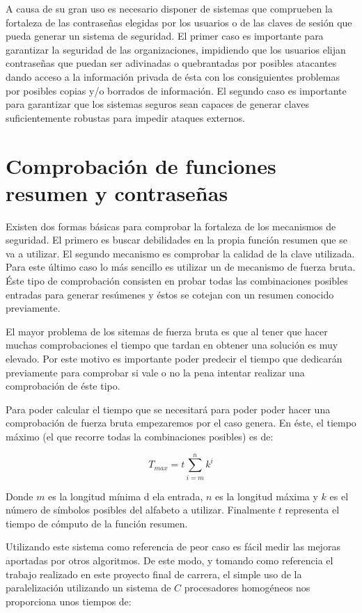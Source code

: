 A causa de su gran uso es necesario disponer de sistemas que comprueben la fortaleza de las contraseñas elegidas por los usuarios o de las claves de sesión que pueda generar un sistema de seguridad. El primer caso es importante para garantizar la seguridad de las organizaciones, impidiendo que los usuarios elijan contraseñas que puedan ser adivinadas o quebrantadas por posibles atacantes dando acceso a la información privada de ésta con los consiguientes problemas por posibles copias y/o borrados de información. El segundo caso es importante para garantizar que los sistemas seguros sean capaces de generar claves suficientemente robustas para impedir ataques externos.

\section{Comprobación de funciones resumen y contraseñas}

Existen dos formas básicas para comprobar la fortaleza de los mecanismos de seguridad. El primero es buscar debilidades en la propia función resumen que se va a utilizar. El segundo mecanismo es comprobar la calidad de la clave utilizada. Para este último caso lo más sencillo es utilizar un de mecanismo de fuerza bruta. Éste tipo de comprobación consisten en probar todas las combinaciones posibles entradas para generar resúmenes y éstos se cotejan con un resumen conocido previamente.

El mayor problema de los sitemas de fuerza bruta es que al tener que hacer muchas comprobaciones el tiempo que tardan en obtener una solución es muy elevado. Por este motivo es importante poder predecir el tiempo que dedicarán previamente para comprobar si vale o no la pena intentar realizar una comprobación de éste tipo.

Para poder calcular el tiempo que se necesitará para poder poder hacer una comprobación de fuerza bruta empezaremos por el caso genera. En éste, el tiempo máximo (el que recorre todas la combinaciones posibles) es de:

$$ T_{max}=t\sum^n_{i=m}k^i $$
 
Donde $m$ es la longitud mínima d ela entrada, $n$ es la longitud máxima y $k$ es el número de símbolos posibles del alfabeto a utilizar. Finalmente $t$ representa el tiempo de cómputo de la función resumen.

Utilizando este sistema como referencia de peor caso es fácil medir las mejoras aportadas por otros algoritmos. De este modo, y tomando como referencia el trabajo realizado en este proyecto final de carrera, el simple uso de la paralelización utilizando un sistema de $C$ procesadores homogéneos nos proporciona unos tiempos de:

